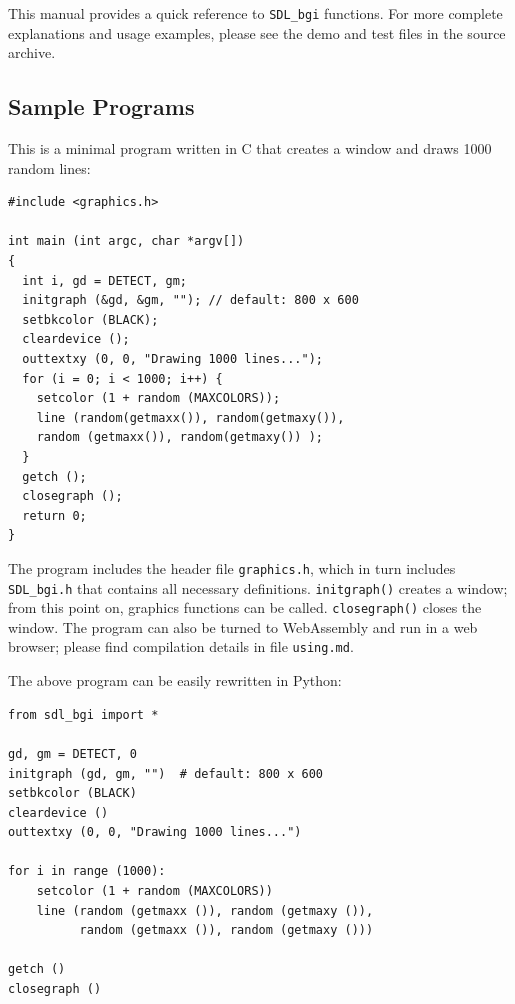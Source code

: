 \documentclass[a4paper,12pt]{article}
\newcommand{\ntt}[1]{\texttt{#1}}
\newcommand{\fn}[1]{\ntt{#1}}        %
\newcommand{\F}[1]{\ntt{#1}}         %
\newcommand{\file}[1]{\ntt{#1}}      %
\newcommand{\SDLbgi}{\texttt{SDL\_bgi}}
\begin{document}
This manual provides a quick reference to \SDLbgi{} functions. For 
more complete explanations and usage examples, please see the
demo and test files in the source archive.


\subsection{Sample Programs}

This is a minimal program written in C that creates a window and draws
1000 random lines:


\begin{lstlisting}
#include <graphics.h>

int main (int argc, char *argv[])
{
  int i, gd = DETECT, gm;
  initgraph (&gd, &gm, ""); // default: 800 x 600
  setbkcolor (BLACK);
  cleardevice ();
  outtextxy (0, 0, "Drawing 1000 lines...");
  for (i = 0; i < 1000; i++) {
    setcolor (1 + random (MAXCOLORS));
    line (random(getmaxx()), random(getmaxy()),
    random (getmaxx()), random(getmaxy()) );
  }
  getch ();
  closegraph ();
  return 0;
}
\end{lstlisting}

The program includes the header file \F{graphics.h}, which in turn
includes \F{SDL\_bgi.h} that contains all necessary definitions.
\fn{initgraph()} creates a window; from this point on, graphics
functions can be called. \fn{closegraph()} closes the window. The
program can also be turned to WebAssembly and run in a web browser;
please find compilation details in file \file{using.md}.

The above program can be easily rewritten in Python:


\lstset{language=Python}

\begin{lstlisting}
from sdl_bgi import *

gd, gm = DETECT, 0
initgraph (gd, gm, "")  # default: 800 x 600
setbkcolor (BLACK)
cleardevice ()
outtextxy (0, 0, "Drawing 1000 lines...")

for i in range (1000):
    setcolor (1 + random (MAXCOLORS))
    line (random (getmaxx ()), random (getmaxy ()),
          random (getmaxx ()), random (getmaxy ()))

getch ()
closegraph ()
\end{lstlisting}
\end{document}
